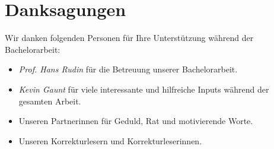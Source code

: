 \chapter*{Danksagungen}

Wir danken folgenden Personen für Ihre Unterstützung während der Bachelorarbeit:

\begin{itemize}
	\item \emph{Prof. Hans Rudin} für die Betreuung unserer Bachelorarbeit.
	\item \emph{Kevin Gaunt} für viele interessante und hilfreiche Inputs während der gesamten Arbeit.
	\item Unseren Partnerinnen für Geduld, Rat und motivierende Worte.
	\item Unseren Korrekturlesern und Korrekturleserinnen.
\end{itemize}